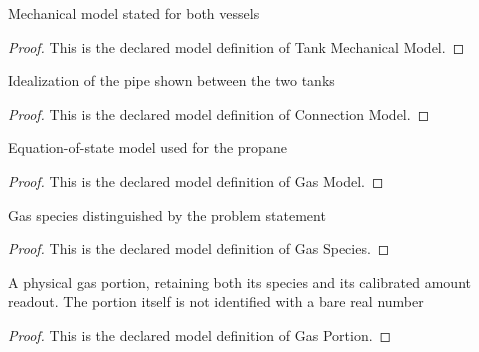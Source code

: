 \begin{definition}
  \label{def:physics:phyx-mini-0400:phyxminiproblems-problemphyxmini0400-tankmechanicalmodel}
  Mechanical model stated for both vessels
\end{definition}
\begin{proof}
  This is the declared model definition of Tank Mechanical Model.
\end{proof}
\begin{definition}
  \label{def:physics:phyx-mini-0400:phyxminiproblems-problemphyxmini0400-connectionmodel}
  Idealization of the pipe shown between the two tanks
\end{definition}
\begin{proof}
  This is the declared model definition of Connection Model.
\end{proof}
\begin{definition}
  \label{def:physics:phyx-mini-0400:phyxminiproblems-problemphyxmini0400-gasmodel}
  Equation-of-state model used for the propane
\end{definition}
\begin{proof}
  This is the declared model definition of Gas Model.
\end{proof}
\begin{definition}
  \label{def:physics:phyx-mini-0400:phyxminiproblems-problemphyxmini0400-gasspecies}
  Gas species distinguished by the problem statement
\end{definition}
\begin{proof}
  This is the declared model definition of Gas Species.
\end{proof}
\begin{definition}
  \label{def:physics:phyx-mini-0400:phyxminiproblems-problemphyxmini0400-gasportion}
  A physical gas portion, retaining both its species and its calibrated amount readout. The portion itself is not identified with a bare real number
\end{definition}
\begin{proof}
  This is the declared model definition of Gas Portion.
\end{proof}
